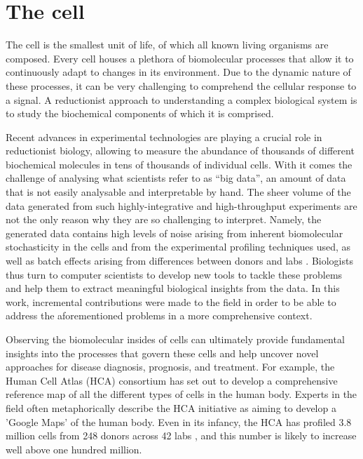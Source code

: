 
\section{The cell}
The cell is the smallest unit of life, of which all known living organisms are composed. Every cell houses a plethora of biomolecular processes that allow it to continuously adapt to changes in its environment. Due to the dynamic nature of these processes, it can be very challenging to comprehend the cellular response to a signal. A reductionist approach to understanding a complex biological system is to study the biochemical components of which it is comprised\cite{brigandt_reductionismbiology_2017}.

Recent advances in experimental technologies are playing a crucial role in reductionist biology, allowing to measure the abundance of thousands of different biochemical molecules in tens of thousands of individual cells. With it comes the challenge of analysing what scientists refer to as “big data”, an amount of data that is not easily analysable and interpretable by hand. The sheer volume of the data generated from such highly-integrative and high-throughput experiments are not the only reason why they are so challenging to interpret. Namely, the generated data contains high levels of noise arising from inherent biomolecular stochasticity in the cells and from the experimental profiling techniques used, as well as batch effects arising from differences between donors and labs \cite{hon_humancellatlas_2018}. Biologists thus turn to computer scientists
to develop new tools to tackle these problems and help them to extract meaningful biological insights from the data. In this work, incremental contributions were made to the field in order to be able to address the aforementioned problems in a more comprehensive context.

Observing the biomolecular insides of cells can ultimately provide fundamental insights into the processes that govern these cells and help uncover novel approaches for disease diagnosis, prognosis, and treatment. For example, the Human Cell Atlas (HCA) consortium \cite{regev_humancellatlas_2018} has set out to develop a comprehensive reference map of all the different types of cells in the human body. Experts in the field often metaphorically describe the HCA initiative as aiming to develop a 'Google Maps' of the human body. Even in its infancy, the HCA has profiled 3.8 million cells from 248 donors across 42 labs \cite{humancellatlasconsortium_humancellatlas_2018}, and this number is likely to increase well above one hundred million.

